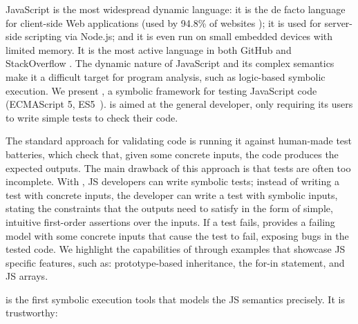 
JavaScript is the most widespread dynamic language: it is the de facto language for client-side Web applications (used by 94.8\% of websites \cite{JS948percent});
it is used for server-side scripting via Node.js; and it is even run on small embedded devices with limited 
memory. It is the most active language in both GitHub \cite{GithubActive} and StackOverflow \cite{SOActive}.
The dynamic nature of JavaScript and its complex semantics make it a difficult target for
program analysis, such as logic-based symbolic execution.  
We present \cosette, a symbolic framework for testing JavaScript code (ECMAScript 5, ES5~\cite{ecma}). 
%
\cosette is aimed at the general developer, only requiring its users to write simple tests to check their code. 


The standard approach for validating code is running it against 
human-made test batteries, which check that, given some concrete inputs, the code produces the expected
outputs. The main drawback of this approach is that tests are often
too incomplete. With \cosette, JS developers can write symbolic tests; instead of 
writing a test with concrete inputs, the developer can write a test with symbolic inputs,
stating the constraints that the outputs need to satisfy in the form of simple, intuitive 
first-order assertions over the inputs. If a test fails, \cosette provides a failing model with some 
concrete inputs that cause the test to fail, exposing bugs in the tested code. 
We highlight the capabilities of \cosette through examples that showcase
JS specific features, such as: prototype-based inheritance, 
the for-in statement, and JS arrays.


\cosette is the first symbolic execution tools that models the JS semantics precisely. 
It is trustworthy: 







